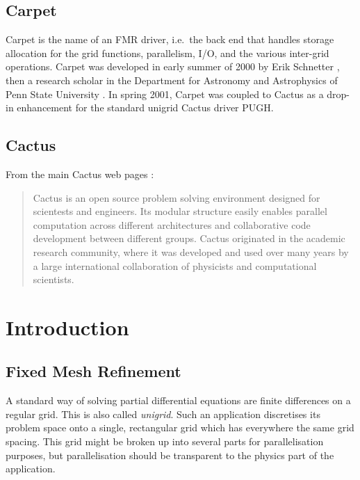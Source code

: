 \subsection{Carpet}

Carpet is the name of an FMR driver, i.e.\ the back end that handles
storage allocation for the grid functions, parallelism, I/O, and the
various inter-grid operations.  Carpet was developed in early summer
of 2000 by Erik Schnetter \cite{Carpet__erik-schnetter}, then a
research scholar in the Department for Astronomy and Astrophysics
\cite{Carpet__astro-psu-edu} of Penn State University
\cite{Carpet__psu-edu}.  In spring 2001, Carpet was coupled to Cactus
as a drop-in enhancement for the standard unigrid Cactus driver PUGH.

\subsection{Cactus}

From the main Cactus web pages \cite{Carpet__cactuscode-org}:
\begin{quote}
Cactus is an open source problem solving environment designed for
scientests and engineers.  Its modular structure easily enables
parallel computation across different architectures and collaborative
code development between different groups.  Cactus originated in the
academic research community, where it was developed and used over many
years by a large international collaboration of physicists and
computational scientists.
\end{quote}



\section{Introduction}

\subsection{Fixed Mesh Refinement}

A standard way of solving partial differential equations are finite
differences on a regular grid.  This is also called \emph{unigrid}.
Such an application discretises its problem space onto a single,
rectangular grid which has everywhere the same grid spacing.  This
grid might be broken up into several parts for parallelisation
purposes, but parallelisation should be transparent to the physics
part of the application.

